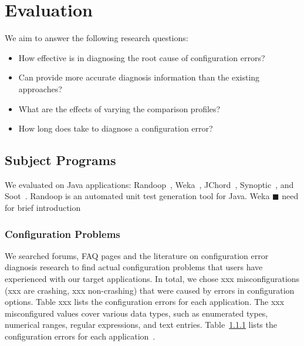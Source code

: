 \section{Evaluation}
\label{sec:evaluation}


We aim to answer the following research questions:

\begin{itemize}
\item How effective is \ourtool in diagnosing the root cause of
configuration errors?
\item Can \ourtool provide more accurate diagnosis information than
the existing approaches? 
\item What are the effects of varying the comparison profiles?
\item How long does \ourtool take to diagnose a configuration error?
\end{itemize}

\subsection{Subject Programs}

We evaluated \ourtool on \subjectnum Java applications: Randoop~\cite{randoop},
Weka~\cite{weka}, JChord~\cite{jchord}, Synoptic~\cite{synoptic},
and Soot~\cite{soot}. Randoop is an automated unit test generation tool
for Java. Weka $\blacksquare$ need for brief introduction

\subsubsection{Configuration Problems}


We searched forums, FAQ pages and the literature on configuration error diagnosis
research to find actual configuration problems that users have experienced with our
target applications. In total, we chose xxx misconfigurations (xxx
are crashing, xxx non-crashing) that were caused by errors in
configuration options. Table xxx lists the configuration errors for each application.
The xxx misconfigured values cover various data types, such as enumerated types,
numerical ranges, regular expressions, and text entries. Table~\ref{} lists
the configuration errors for each application~\cite{tab:subjects}.

